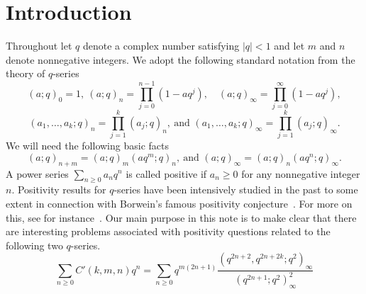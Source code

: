 \documentclass[reqno]{amsart}
\theoremstyle{definition}
\theoremstyle{plain}
\theoremstyle{remark}
\numberwithin{equation}{section}
\newcommand{\fr}{\frac}
\newcommand*\pFq[5]{%
  \begingroup
  \begingroup\lccode`~=`,
  \lowercase{\endgroup\def~}{\pFcomma\mkern\pFqskip}%
 \mathcode`,=\string"8000
 {}_{#1}\phi_{#2}\biggl[\genfrac..{0pt}{}{#3}{#4};#5\biggr]%
 \endgroup
 }
\begin{document}
\section{Introduction}
Throughout let $q$ denote a complex number satisfying $|q|<1$
and let $m$ and $n$ denote nonnegative integers.
We adopt the following standard notation from the theory of $q$-series~\cite{Andrews, Gasper-Rahman}
\[
(a;q)_0 = 1,\  (a;q)_n = \prod_{j=0}^{n-1} (1-aq^j),\quad
(a;q)_{\infty} = \prod_{j=0}^{\infty} (1-aq^j),
\]
\[
(a_1,\ldots,a_k;q)_n = \prod_{j=1}^k (a_j;q)_n,\ \text{and\ }
(a_1,\ldots,a_k;q)_{\infty} = \prod_{j=1}^k (a_j;q)_{\infty}.
\]
We will need the following basic facts
\begin{equation}\label{basic}
(a;q)_{n+m} = (a;q)_{m} (aq^{m};q)_n,\ \text{and\ }
(a;q)_{\infty} = (a;q)_n (aq^n;q)_{\infty}.
\end{equation}
A power series $\sum_{n\geq 0} a_n q^n$ is called positive %
if $a_n \geq 0$ for any nonnegative integer $n$. %
Positivity results for $q$-series have been intensively studied in the past to some extent in connection with
Borwein's famous positivity conjecture~\cite{Andrews 1995}.
For more on this, see for instance~\cite{Berkovich-Warnaar, Bressoud, Wang, Warnaar-Zudilin}.
Our main purpose in this note is to make clear that there are interesting
problems associated with positivity questions related to the following two $q$-series.
\begin{equation}\label{main series1}
\sum_{n\geq 0}C'(k,m,n) q^n = \sum_{n\geq 0} q^{m(2n+1)} \fr{(q^{2n+2},q^{2n+2k};q^2)_\infty}{(q^{2n+1};q^2)_\infty^2}
\end{equation}
\end{document}
